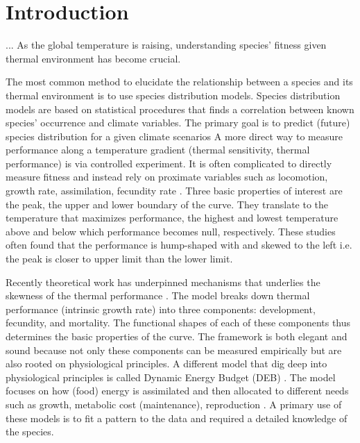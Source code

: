\section*{Introduction}
...
As the global temperature is raising, understanding species' fitness given thermal environment has become crucial.

The most common method to elucidate the relationship between a species and its thermal environment is to use species distribution models. 
Species distribution models are based on  statistical procedures that finds a correlation between known species' occurrence and climate variables.
The primary goal is to predict (future) species distribution for a given climate scenarios \citep{Guisan2005, Austin2007, Elith2009}
A more direct way to measure performance along a temperature gradient (thermal sensitivity, thermal performance) is via controlled experiment.
It is often complicated to directly measure fitness and instead rely on proximate variables such as locomotion, growth rate, assimilation, fecundity rate \citep[][and reference therein]{Angilletta2009}.
Three basic properties of interest are the peak, the upper and lower boundary of the curve.
They translate to the temperature that maximizes performance, the highest and lowest temperature above and below which performance becomes null, respectively. 
These studies often found that the performance is hump-shaped with and skewed to the left i.e. the peak is closer to upper limit than the lower limit.

Recently theoretical work has underpinned mechanisms that underlies the skewness of the thermal performance \citep{Amarasekare2012}.
The model  breaks down thermal performance (intrinsic growth rate)  into three components: development, fecundity, and mortality.
The functional shapes of each of these components thus determines the basic properties of the curve.
The framework is both elegant and sound because not only these components can be measured empirically but are also rooted on physiological principles.
A different model that dig deep into physiological principles is called Dynamic Energy Budget (DEB) \citep{Kooijman2009}.
The model focuses on how (food) energy is assimilated and then allocated to different needs such as growth, metabolic cost (maintenance), reproduction \citep{Kooijman2009}.
A primary use of  these models is to fit a pattern to the data and required a detailed knowledge of the species.  

